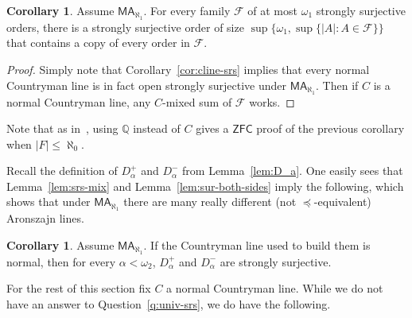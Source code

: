 \documentclass[10pt]{amsart}
\theoremstyle{definition}
\newtheorem{corollary}[theorem]{Corollary}
\theoremstyle{remark}
\newcommand{\axiom}[1]{\mathsf{#1}}
\newcommand{\ZFC}{\axiom{ZFC}}
\newcommand{\MA}{\axiom{MA}}
\newcommand{\cal}[1]{\mathcal{#1}}
\newcommand{\eleq}{\preceq}
\newcommand{\1}{\mathbbm{1}}
\begin{document}
\begin{corollary}
  Assume $\MA_{\aleph_{1}}$. For every family $\cal{F}$ of
  at most $\omega_{1}$ strongly surjective orders, there is a strongly
  surjective order of size $\sup\{\omega_{1},\sup\{|A| : A \in \cal{F}\}\}$
  that contains a copy of every order in $\cal{F}$.
\end{corollary}
\begin{proof}
  Simply note that Corollary~\ref{cor:cline-srs} implies that every normal
  Countryman line is in fact open strongly surjective under
  $\MA_{\aleph_{1}}$. Then if $C$ is a normal Countryman line,
  any $C$-mixed sum of $\cal{F}$ works.
\end{proof}

Note that as in~\cite{Soukup}, using $\mathbb{Q}$ instead of $C$
gives a $\ZFC$ proof of the previous corollary when $|F| \le \aleph_{0}$.

Recall the definition of $D_{\alpha}^{+}$ and $D_{\alpha}^{-}$ from
 Lemma~\ref{lem:D_a}.  One easily sees that Lemma~\ref{lem:srs-mix} and
 Lemma~\ref{lem:sur-both-sides} imply the following, which shows that under
$\MA_{\aleph_{1}}$ there are many really different (not $\eleq$-equivalent)
Aronszajn lines.

\begin{corollary}\label{lem:D_a_srs}
  Assume $\MA_{\aleph_{1}}$. If the Countryman line used to build them is
  normal, then for every $\alpha < \omega_{2}$, $D_{\alpha}^{+}$ and
  $D_{\alpha}^{-}$ are strongly surjective.
\end{corollary}

For the rest of this section fix $C$ a normal Countryman line.
While we do not have an answer to Question~\ref{q:univ-srs}, we
do have the following.
\end{document}
